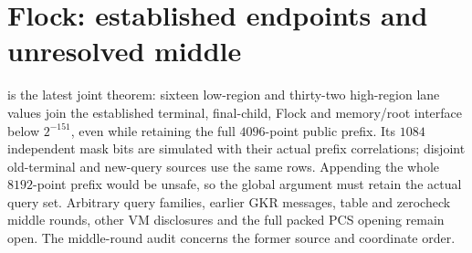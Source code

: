 \section{Flock: established endpoints and unresolved middle}\label{sec:flock}

 is the latest joint theorem: sixteen low-region and thirty-two high-region lane values join the established terminal, final-child, Flock and memory/root interface below $2^{-151}$, even while retaining the full $4096$-point public prefix. Its $1084$ independent mask bits are simulated with their actual prefix correlations; disjoint old-terminal and new-query sources use the same rows. Appending the whole $8192$-point prefix would be unsafe, so the global argument must retain the actual query set. Arbitrary query families, earlier GKR messages, table and zerocheck middle rounds, other VM disclosures and the full packed PCS opening remain open. The middle-round audit concerns the former source and coordinate order.












